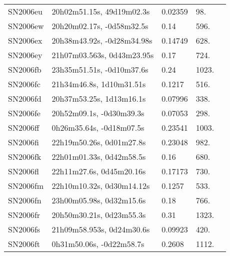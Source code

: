 \begin{longtable}{lllll}
         SN2006eu &      20h02m51.15s, 49d19m02.3s &  0.02359 &            98. &    \citet{1999ApJS..121..287H} \\
         SN2006ew &      20h20m02.17s, -0d58m32.5s &     0.14 &           596. &    \citet{2006IAUC.8749B...1F} \\
         SN2006ex &     20h38m43.92s, -0d28m34.98s &  0.14749 &           628. &    \citet{2011ApJ...740...92G} \\
         SN2006ey &     21h07m03.563s, 0d43m23.95s &     0.17 &           724. &    \citet{2006IAUC.8749B...1F} \\
         SN2006fb &      23h35m51.51s, -0d10m37.6s &     0.24 &          1023. &    \citet{2006IAUC.8749B...1F} \\
         SN2006fc &       21h34m46.8s, 1d10m31.51s &   0.1217 &           516. &    \citet{2011ApJ...740...92G} \\
         SN2006fd &       20h37m53.25s, 1d13m16.1s &  0.07996 &           338. &    \citet{2004SDSS2.C...0000:} \\
         SN2006fe &       20h52m09.1s, -0d30m39.3s &  0.07053 &           298. &    \citet{2004SDSS2.C...0000:} \\
         SN2006ff &       0h26m35.64s, -0d18m07.5s &  0.23541 &          1003. &    \citet{2003SDSS1.C...0000:} \\
         SN2006fi &       22h19m50.26s, 0d01m27.8s &  0.23048 &           982. &    \citet{2004SDSS2.C...0000:} \\
         SN2006fk &       22h01m01.33s, 0d42m58.5s &     0.16 &           680. &    \citet{2006IAUC.8749B...1F} \\
         SN2006fl &       22h11m27.6s, 0d45m20.16s &  0.17173 &           730. &    \citet{2011ApJ...740...92G} \\
         SN2006fm &      22h10m10.32s, 0d30m14.12s &   0.1257 &           533. &    \citet{2011ApJ...740...92G} \\
         SN2006fn &       23h00m05.98s, 0d32m15.6s &     0.18 &           766. &    \citet{2006IAUC.8749B...1F} \\
         SN2006fr &       20h50m30.21s, 0d23m55.3s &     0.31 &          1323. &    \citet{2006CBET..627A...1B} \\
         SN2006fs &      21h09m58.953s, 0d24m30.6s &  0.09923 &           420. &    \citet{2004SDSS2.C...0000:} \\
         SN2006ft &       0h31m50.06s, -0d22m58.7s &   0.2608 &          1112. &    \citet{2011ApJ...740...92G} \\

\end{longtable}

